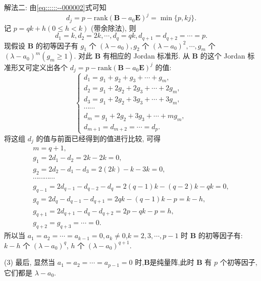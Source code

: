 \documentclass[../../main.tex]{subfiles}%
\begin{document}
\begin{solution}
{\color{blue}解法二:}
由\eqref{eq::::::--000002}式可知
\[
d_j = p - \mathrm{rank}(\boldsymbol{B} - a_0\boldsymbol{E})^j = \min\{p, kj\}.
\]
记 $p = qk + h(0 \leqslant h < k)$ (带余除法), 则
\[
d_1 = k, d_2 = 2k, \cdots, d_q = qk, d_{q+1} = d_{q+2} = \cdots = p.
\]
现假设 $\boldsymbol{B}$ 的初等因子有 $g_1$ 个 $(\lambda - a_0), g_2$ 个 $(\lambda - a_0)^2, \cdots, g_m$ 个 $(\lambda - a_0)^m(g_m \geqslant 1)$. 对此 $\boldsymbol{B}$ 有相应的 Jordan 标准形. 从 $\boldsymbol{B}$ 的这个 Jordan 标准形又可定义出各个 $d_j = p - \mathrm{rank}(\boldsymbol{B} - a_0\boldsymbol{E})^j$ 的值:
\[
\begin{cases} 
d_1 = g_1 + g_2 + g_3 + \cdots + g_m, \\
d_2 = g_1 + 2g_2 + 2g_3 + \cdots + 2g_m, \\
d_3 = g_1 + 2g_2 + 3g_3 + \cdots + 3g_m, \\
\cdots \cdots \\
d_m = g_1 + 2g_2 + 3g_3 + \cdots + mg_m, \\
d_{m+1} = d_{m+2} = \cdots = d_p.
\end{cases}
\]
将这组 $d_j$ 的值与前面已经得到的值进行比较, 可得
\begin{gather*}
m=q+1,
\\
g_1=2d_1-d_2=2k-2k=0,
\\
g_2=2d_2-d_1-d_3=2(2k)-k-3k=0,
\\
\cdots \cdots \cdots \cdots 
\\
g_{q-1}=2d_{q-1}-d_{q-2}-d_q=2(q-1)k-(q-2)k-qk=0,
\\
g_q=2d_q-d_{q-1}-d_{q+1}=2qk-(q-1)k-p=k-h,
\\
g_{q+1}=2d_{q+1}-d_q-d_{q+2}=2p-qk-p=h,
\\
g_{q+2}=g_{q+3}=\cdots =0.
\end{gather*}
所以当 $a_1 = a_2 = \cdots = a_{k-1} = 0, a_k \neq 0$,$k=2,3,\cdots,p-1$ 时 $\boldsymbol{B}$ 的初等因子有: $k - h$ 个 $(\lambda - a_0)^q$, $h$ 个 $(\lambda - a_0)^{q+1}$.

(3) 最后, 显然当 $a_1 = a_2 = \cdots = a_{p-1} = 0$ 时,$\boldsymbol{B}$是纯量阵,此时 $\boldsymbol{B}$ 有 $p$ 个初等因子, 它们都是 $\lambda - a_0$.

\end{solution}
\end{document}
